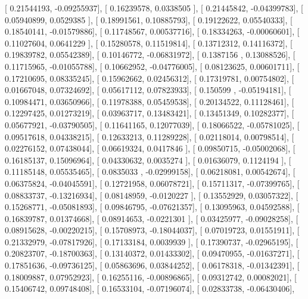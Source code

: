\documentclass{article}
\begin{document}
       [ 0.21544193, -0.09255937],
       [ 0.16239578,  0.0338505 ],
       [ 0.21445842, -0.04399783],
       [ 0.05940899,  0.0529385 ],
       [ 0.18991561,  0.10885793],
       [ 0.19122622,  0.05540333],
       [ 0.18540141, -0.01579886],
       [ 0.11748567,  0.00537716],
       [ 0.18334263, -0.00060601],
       [ 0.11027604,  0.0641229 ],
       [ 0.15280578,  0.11519814],
       [ 0.13712312,  0.14116372],
       [ 0.19839782,  0.05542389],
       [ 0.10146772, -0.06831972],
       [ 0.1387156 ,  0.13088526],
       [ 0.11715965, -0.01055788],
       [ 0.10662952, -0.04776005],
       [ 0.08123625,  0.00601711],
       [ 0.17210695,  0.08335245],
       [ 0.15962662,  0.02456312],
       [ 0.17319781,  0.00754802],
       [ 0.01667048,  0.07324692],
       [ 0.05617112,  0.07823933],
       [ 0.150599  , -0.05194181],
       [ 0.10984471,  0.03650966],
       [ 0.11978388,  0.05459538],
       [ 0.20134522,  0.11128461],
       [ 0.12297425,  0.01273219],
       [ 0.03963717,  0.13483421],
       [ 0.13451349,  0.10282377],
       [ 0.05677921, -0.03790505],
       [ 0.11641165,  0.12077039],
       [ 0.18066522, -0.05781025],
       [ 0.09517618,  0.04338215],
       [ 0.12633213,  0.11289228],
       [ 0.02118014,  0.00798514],
       [ 0.02276152,  0.07438044],
       [ 0.06619324,  0.0417846 ],
       [ 0.09850715, -0.05002068],
       [ 0.16185137,  0.15096964],
       [ 0.04330632,  0.0035274 ],
       [ 0.01636079,  0.1124194 ],
       [ 0.11185148,  0.05535465],
       [ 0.0835033 , -0.02999158],
       [ 0.06218081,  0.00542674],
       [ 0.06375824, -0.04045591],
       [ 0.12721958,  0.06078721],
       [ 0.15711317, -0.07399765],
       [ 0.08833737, -0.13216934],
       [ 0.08148959, -0.0120227 ],
       [ 0.13552929,  0.03057322],
       [ 0.15268771, -0.05081893],
       [ 0.09846795, -0.07621357],
       [ 0.13095963,  0.04592588],
       [ 0.16839787,  0.01374668],
       [ 0.08914653, -0.0221301 ],
       [ 0.03425977, -0.09028258],
       [ 0.08915628, -0.00220215],
       [ 0.15708973, -0.18044037],
       [ 0.07019723,  0.01551911],
       [ 0.21332979, -0.07817926],
       [ 0.17133184,  0.0039939 ],
       [ 0.17390737, -0.02965195],
       [ 0.20823707, -0.18700363],
       [ 0.13140372,  0.01433302],
       [ 0.09470955, -0.01637271],
       [ 0.17851636, -0.09736125],
       [ 0.05863696,  0.03844252],
       [ 0.06178318, -0.01342391],
       [ 0.18009887,  0.07952923],
       [ 0.16255116, -0.00896865],
       [ 0.09312742,  0.00082021],
       [ 0.15406742,  0.09748408],
       [ 0.16533104, -0.07196074],
       [ 0.02833738, -0.06430406],
\end{document}
